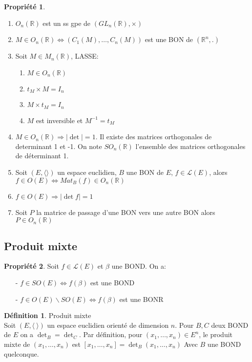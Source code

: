 \documentclass[fleqn]{article}
\theoremstyle{definition} \newtheorem*{defi}{D\'efinition}
\theoremstyle{definition} \newtheorem*{theo}{Th\'eor\`eme}
\theoremstyle{definition} \newtheorem*{coro}{Corollaire}
\theoremstyle{remark} \newtheorem*{rqs}{Remarques}
\theoremstyle{definition} \newtheorem*{prop}{Propri\'et\'e}
\begin{document}
\begin{prop} $ $
	\begin{enumerate}
		\item $O_n(\mathbb{R})$ est un ss gpe de $(GL_n(\mathbb{R}), \times)$
		\item $M \in O_n(\mathbb{R}) \Leftrightarrow (C_1(M), \hdots, C_n(M))$ est une BON de $(\mathbb{R}^n, .)$
		\item Soit $M \in M_n(\mathbb{R})$, LASSE:
			\begin{enumerate}
				\item $M \in O_n(\mathbb{R})$
				\item $t_M \times M = I_n$
				\item $M \times t_M = I_n$
				\item $M$ est inversible et $M^{-1} = t_M$
			\end{enumerate}
		\item $M \in O_n(\mathbb{R}) \Rightarrow |\det| = 1$.  Il existe des matrices orthogonales de determinant 1 et -1. On note
			$SO_n(\mathbb{R})$ l'ensemble des matrices orthogonales de d\'eterminant 1.
		\item Soit $(E, \langle  \rangle)$ un espace euclidien, $B$ une BON de $E$, $f \in \mathscr{L}(E)$, alors $f \in O(E) \Leftrightarrow Mat_B(f)
			\in O_n(\mathbb{R})$
		\item $f \in O(E) \Rightarrow |\det f| = 1$
		\item Soit $P$ la matrice de passage d'une BON vers une autre BON alors $P \in O_n(\mathbb{R})$
	\end{enumerate}
\end{prop}

\subsection{Produit mixte}

\begin{prop}
	Soit $f \in \mathscr{L}(E)$ et $\beta$ une BOND. On a:
	\begin{itemize}
		\item [-] $f \in SO(E) \Leftrightarrow f(\beta)$ est une BOND
		\item [-] $f \in O(E) \backslash SO(E) \Leftrightarrow f(\beta)$ est une BONR
	\end{itemize}
\end{prop}

\begin{defi} Produit mixte \\
	Soit $(E, \langle\   \rangle)$ un espace euclidien orient\'e de dimension $n$. Pour $B,C$ deux BOND de $E$ on a $\det_B = \det_C$.
	Par d\'efinition, pour $(x_1, \hdots, x_n) \in E^n$, le produit mixte de $(x_1, \hdots, x_n)$ est $[x_1, \hdots, x_n] =
	\det_B (x_1, \hdots, x_n)$ Avec $B$ une BOND quelconque.
\end{defi}
\end{document}
